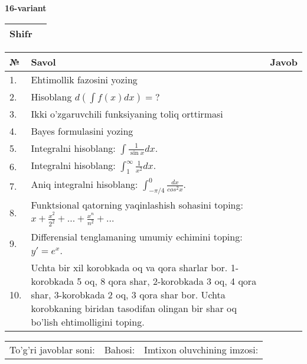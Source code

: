 \documentclass{article}
\begin{document}
  \egroup
  
  \newpage
  
  
  \textbf{16-variant}\\
  
  \bgroup
  \def\arraystretch{1.6} %
  
  \begin{tabular}{|m{5.7cm}|m{9.5cm}|}
  \hline
  Shifr & \\
  \hline
  \end{tabular}
  
  \vspace{1cm}
  
  \begin{tabular}{|m{0.7cm}|m{10cm}|m{4cm}|}
  \hline
  № & Savol & Javob \\
  \hline
  1. & Ehtimollik fazosini yozing &  \\
  \hline
  2. & Hisoblang \(d\left( \int {f(x)dx} \right) = ?\) &  \\
  \hline
  3. & Ikki o'zgaruvchili funksiyaning toliq orttirmasi &  \\
  \hline
  4. & Bayes formulasini yozing &  \\
  \hline
  5. & Integralni hisoblang: \(\int {\frac{1}{\sin x}dx}\). &  \\
  \hline
  6. & Integralni hisoblang: \(\int_{1}^{\infty}{\frac{1}{x^{2}}dx}\). &  \\
  \hline
  7. & Aniq integralni hisoblang: \(\int_{- \pi/4}^{0}\frac{dx}{cos^{2}x}\). &  \\
  \hline
  8. & Funktsional qatorning yaqinlashish sohasini toping: \(x + \frac{x^{2}}{2^{2}} + ... + \frac{x^{n}}{n^{2}} + ...\) &  \\
  \hline
  9. & Differensial tenglamaning umumiy echimini toping: \(y' = e^{x}\). &  \\
  \hline
  10. & Uchta bir xil korobkada oq va qora sharlar bor. 1-korobkada 5 oq, 8 qora shar, 2-korobkada 3 oq, 4 qora shar, 3-korobkada 2 oq, 3 qora shar bor. Uchta korobkaning biridan tasodifan olingan bir shar oq bo'lish ehtimolligini toping. &  \\
  \hline
  \end{tabular}
  
  \vspace{1cm}
  
  \begin{tabular}{lll}
  To'g'ri javoblar soni: \underline{\hspace{1.5cm}} & 
  Bahosi: \underline{\hspace{1.5cm}} & 
  Imtixon oluvchining imzosi: \underline{\hspace{2cm}} \\
  \end{tabular}
  
\end{document}
